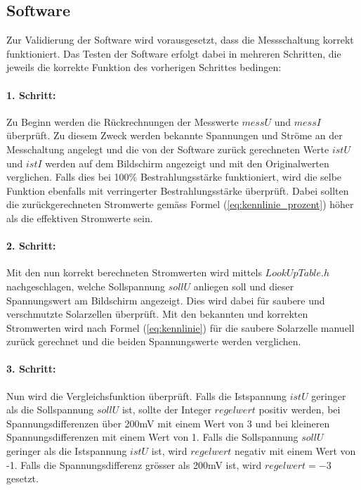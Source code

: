 \subsection{Software}
Zur Validierung der Software wird vorausgesetzt, dass die Messschaltung korrekt funktioniert. Das Testen der Software erfolgt dabei in mehreren Schritten, die jeweils die korrekte Funktion des vorherigen Schrittes bedingen:

\paragraph{1. Schritt:}
Zu Beginn werden die Rückrechnungen der Messwerte $messU$ und $messI$ überprüft. Zu diesem Zweck werden bekannte Spannungen und Ströme an der Messchaltung angelegt und die von der Software zurück gerechneten Werte $istU$ und $istI$ werden auf dem Bildschirm angezeigt und mit den Originalwerten verglichen. Falls dies bei 100\% Bestrahlungsstärke funktioniert, wird die selbe Funktion ebenfalls mit verringerter Bestrahlungsstärke überprüft. Dabei sollten die zurückgerechneten Stromwerte gemäss Formel (\ref{eq:kennlinie_prozent}) höher als die effektiven Stromwerte sein.

\paragraph{2. Schritt:}
Mit den nun korrekt berechneten Stromwerten wird mittels $LookUpTable.h$ nachgeschlagen, welche Sollspannung $sollU$ anliegen soll und dieser Spannungswert am Bildschirm angezeigt. Dies wird dabei für saubere und verschmutzte Solarzellen überprüft. Mit den bekannten und korrekten Stromwerten wird nach Formel (\ref{eq:kennlinie}) für die saubere Solarzelle manuell zurück gerechnet und die beiden Spannungswerte werden verglichen.

\paragraph{3. Schritt:}
Nun wird die Vergleichsfunktion überprüft. Falls die Istspannung $istU$ geringer als die Sollspannung $sollU$ ist, sollte der Integer $regelwert$ positiv werden, bei Spannungsdifferenzen über 200mV mit einem Wert von 3 und bei kleineren Spannungsdifferenzen mit einem Wert von 1. Falls die Sollspannung $sollU$ geringer als die Istspannung $istU$ ist, wird $regelwert$ negativ mit einem Wert von -1. Falls die Spannungsdifferenz grösser als 200mV ist, wird $regelwert=-3$ gesetzt.

